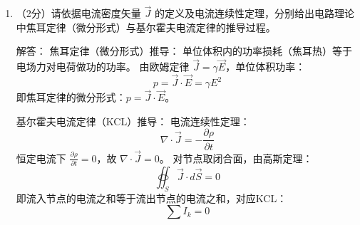 \begin{enumerate}
电源外部：
局外电场 $\vec{E}_e=0$，总电场等于库仑电场，因此：
\[
\oint \vec{E}\cdot d\vec{l} = \oint \vec{E}_c\cdot d\vec{l} = 0
\]
三个积分均为零。

\item （2分）请依据电流密度矢量 $\vec{J}$ 的定义及电流连续性定理，分别给出电路理论中焦耳定律（微分形式）与基尔霍夫电流定律的推导过程。

解答：
焦耳定律（微分形式）推导：
单位体积内的功率损耗（焦耳热）等于电场力对电荷做功的功率。
由欧姆定律 $\vec{J}=\gamma\vec{E}$，单位体积功率：
\[
p = \vec{J}\cdot\vec{E} = \gamma E^2
\]
即焦耳定律的微分形式：$p=\vec{J}\cdot\vec{E}$。

基尔霍夫电流定律（KCL）推导：
电流连续性定理：
\[
\nabla\cdot\vec{J} = -\frac{\partial\rho}{\partial t}
\]
恒定电流下 $\frac{\partial\rho}{\partial t}=0$，故 $\nabla\cdot\vec{J}=0$。
对节点取闭合面，由高斯定理：
\[
\oiint_S \vec{J}\cdot d\vec{S} = 0
\]
即流入节点的电流之和等于流出节点的电流之和，对应KCL：
\[
\sum I_k = 0
\]

\end{enumerate}